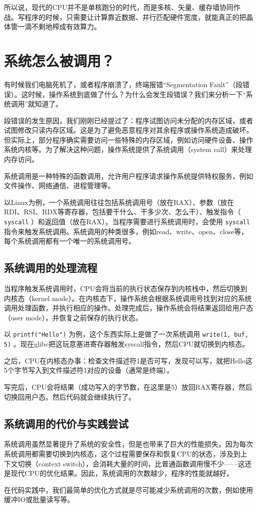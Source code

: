 所以说，现代的CPU并不是单核跑分的时代，而是多核、矢量、缓存墙协同作战。写程序的时候，只需要让计算靠近数据、并行匹配硬件宽度，就能真正的把晶体管一滴不剩地榨成有效算力。

\section{系统怎么被调用？}

有时候我们电脑死机了，或者程序崩溃了，终端报错“Segmentation Fault”（段错误）。这时候，操作系统到底做了什么？为什么会发生段错误？我们来分析一下“系统调用”就知道了。

段错误的发生原因，我们刚刚已经提过了：程序试图访问未分配的内存区域，或者试图修改只读内存区域。这是为了避免恶意程序对其余程序或操作系统造成破坏。但实际上，部分程序确实需要访问一些特殊的内存区域，例如访问硬件设备、操作系统内核等。为了解决这种问题，操作系统提供了系统调用（system call）来处理内存访问。

系统调用是一种特殊的函数调用，允许用户程序请求操作系统提供特权服务，例如文件操作、网络通信、进程管理等。

以Linux为例，一个系统调用往往包括系统调用号（放在RAX）、参数（放在RDI、RSI、RDX等寄存器，包括要干什么、干多少次、怎么干）、触发指令（ \texttt{syscall} ）和返回值（放在RAX）。当程序需要进行系统调用时，会使用 \texttt{syscall} 指令来触发系统调用。系统调用的种类很多，例如read、write、open、close等，每个系统调用都有一个唯一的系统调用号。

\subsection{系统调用的处理流程}

当程序触发系统调用时，CPU会将当前的执行状态保存到内核栈中，然后切换到内核态（kernel mode）。在内核态下，操作系统会根据系统调用号找到对应的系统调用处理函数，并执行相应的操作。处理完成后，操作系统会将结果返回给用户态（user mode），并恢复之前保存的执行状态。

以 \texttt{printf("Hello")} 为例，这个东西实际上是做了一次系统调用 \texttt{write(1, buf, 5)} 。现在glibc把这玩意塞进寄存器触发syscall指令，然后CPU就切换到内核态。

之后，CPU在内核态办事：检查文件描述符1是否可写，发现可以写，就把Hello这5个字节写入到文件描述符1对应的设备（通常是终端）。

写完后，CPU会将结果（成功写入的字节数，在这里是5）放回RAX寄存器，然后切换回用户态。然后代码就会继续执行了。

\subsection{系统调用的代价与实践尝试}

系统调用虽然显著提升了系统的安全性，但是也带来了巨大的性能损失。因为每次系统调用都需要切换到内核态，这个过程需要保存和恢复CPU的状态，涉及到上下文切换（context switch），会消耗大量的时间，比普通函数调用慢不少——这还是现代CPU的优化结果。因此，系统调用的次数越少，程序的性能就越好。

在代码实践中，我们最简单的优化方式就是尽可能减少系统调用的次数，例如使用缓冲IO或批量读写等。